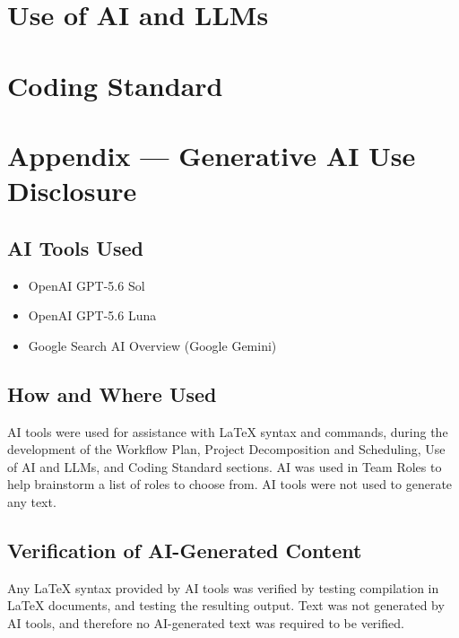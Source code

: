 \documentclass{article}
\begin{document}



\section{Use of AI and LLMs}



\section{Coding Standard}



\newpage{}

\section{Appendix --- Generative AI Use Disclosure}

\subsection{AI Tools Used}

\begin{itemize}
	\item OpenAI GPT-5.6 Sol
	\item OpenAI GPT-5.6 Luna
	\item Google Search AI Overview (Google Gemini)
\end{itemize}

\subsection{How and Where Used}

AI tools were used for assistance with LaTeX syntax and commands, during the 
development of the Workflow Plan, Project Decomposition and Scheduling, Use of 
AI and LLMs, and Coding Standard sections. AI was used in Team Roles to help brainstorm
a list of roles to choose from. AI tools were not used to generate any text.

\subsection{Verification of AI-Generated Content}

Any LaTeX syntax provided by AI tools was verified by testing compilation in 
LaTeX documents, and testing the resulting output. Text was not generated by AI 
tools, and therefore no AI-generated text was required to be verified.
\end{document}
